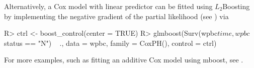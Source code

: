\documentclass{article}
\newcommand{\Rpackage}[1]{{\normalfont\fontseries{b}\selectfont #1}}
\newenvironment{Schunk}{}{}
\begin{document}
Alternatively, a Cox model with linear predictor can be fitted using
$L_2$Boosting by 
implementing the negative gradient  
of the partial likelihood (see \cite{ridgew99}) via
\begin{Schunk}
\begin{Sinput}
R> ctrl <- boost_control(center = TRUE)
R> glmboost(Surv(wpbc$time, wpbc$status == "N") ~ ., 
         data = wpbc, family = CoxPH(), control = ctrl)
\end{Sinput}
\end{Schunk}
For more examples, such as fitting an additive Cox model using
\Rpackage{mboost}, see \citep{Hothorn:2006:Bioinformatics:16940323}.  

\clearpage



\end{document}
